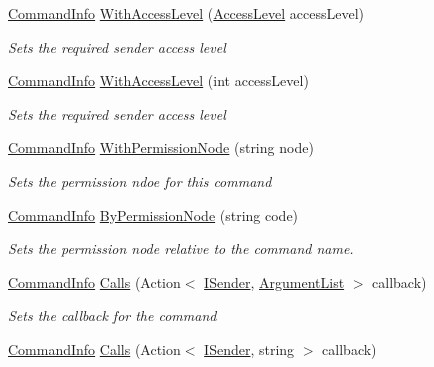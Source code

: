 \begin{DoxyCompactItemize}
\hyperlink{class_o_t_a_1_1_command_1_1_command_info}{Command\+Info} \hyperlink{class_o_t_a_1_1_command_1_1_command_info_ac88a7c0a3c0bd6aea6fa5420255bbc5e}{With\+Access\+Level} (\hyperlink{namespace_o_t_a_1_1_command_a8b5f51579148d05d330f1911083e7a8e}{Access\+Level} access\+Level)
\begin{DoxyCompactList}\small\item\em Sets the required sender access level \end{DoxyCompactList}\item 
\hyperlink{class_o_t_a_1_1_command_1_1_command_info}{Command\+Info} \hyperlink{class_o_t_a_1_1_command_1_1_command_info_a0d5ce5c5ebff49ab3be8c1671e3f9a38}{With\+Access\+Level} (int access\+Level)
\begin{DoxyCompactList}\small\item\em Sets the required sender access level \end{DoxyCompactList}\item 
\hyperlink{class_o_t_a_1_1_command_1_1_command_info}{Command\+Info} \hyperlink{class_o_t_a_1_1_command_1_1_command_info_a45d075e4f25b8f2e226250287741772c}{With\+Permission\+Node} (string node)
\begin{DoxyCompactList}\small\item\em Sets the permission ndoe for this command \end{DoxyCompactList}\item 
\hyperlink{class_o_t_a_1_1_command_1_1_command_info}{Command\+Info} \hyperlink{class_o_t_a_1_1_command_1_1_command_info_aebaf1fb1ebe617f53b1950970ee3bacc}{By\+Permission\+Node} (string code)
\begin{DoxyCompactList}\small\item\em Sets the permission node relative to the command name. \end{DoxyCompactList}\item 
\hyperlink{class_o_t_a_1_1_command_1_1_command_info}{Command\+Info} \hyperlink{class_o_t_a_1_1_command_1_1_command_info_a347b7c26ea03353febc7f4e7dee6b6ee}{Calls} (Action$<$ \hyperlink{interface_o_t_a_1_1_command_1_1_i_sender}{I\+Sender}, \hyperlink{class_o_t_a_1_1_command_1_1_argument_list}{Argument\+List} $>$ callback)
\begin{DoxyCompactList}\small\item\em Sets the callback for the command \end{DoxyCompactList}\item 
\hyperlink{class_o_t_a_1_1_command_1_1_command_info}{Command\+Info} \hyperlink{class_o_t_a_1_1_command_1_1_command_info_a9ecbdf31147c786e7ed0dfcc6dd5cf5f}{Calls} (Action$<$ \hyperlink{interface_o_t_a_1_1_command_1_1_i_sender}{I\+Sender}, string $>$ callback)

\end{DoxyCompactItemize}
